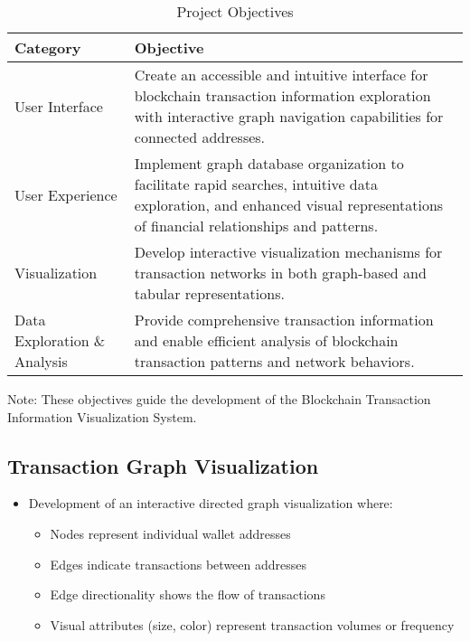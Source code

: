 \begin{table}[htbp]
\centering
\renewcommand{\arraystretch}{1.3}
\setlength{\tabcolsep}{10pt}
\begin{threeparttable}
\caption{Project Objectives}
\label{tab:objectives}
\begin{tabular}{p{}p{}}
\toprule
\textbf{Category} & \textbf{Objective} \\
\midrule
User Interface & Create an accessible and intuitive interface for blockchain transaction information exploration with interactive graph navigation capabilities for connected addresses. \\
\addlinespace
User Experience & Implement graph database organization to facilitate rapid searches, intuitive data exploration, and enhanced visual representations of financial relationships and patterns. \\
\addlinespace
Visualization & Develop interactive visualization mechanisms for transaction networks in both graph-based and tabular representations. \\
\addlinespace
Data Exploration \& Analysis & Provide comprehensive transaction information and enable efficient analysis of blockchain transaction patterns and network behaviors. \\
\bottomrule
\end{tabular}
\begin{tablenotes}[flushleft]
\small
\item Note: These objectives guide the development of the Blockchain Transaction Information Visualization System.
\end{tablenotes}
\end{threeparttable}
\end{table}

\subsection{Transaction Graph Visualization}
\begin{itemize}
    \item Development of an interactive directed graph visualization where:
    \begin{itemize}
        \item Nodes represent individual wallet addresses
        \item Edges indicate transactions between addresses
        \item Edge directionality shows the flow of transactions
        \item Visual attributes (size, color) represent transaction volumes or frequency
    \end{itemize}
\end{itemize}

